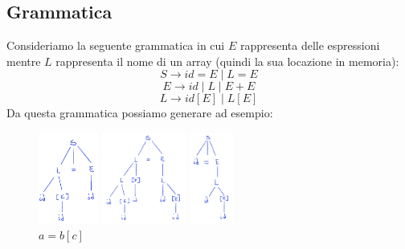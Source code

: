 \documentclass[11pt]{article}
\begin{document}
\subsection{Grammatica}
Consideriamo la seguente grammatica in cui $E$ rappresenta delle espressioni 
mentre $L$ rappresenta il nome di un array (quindi la sua locazione in memoria):
$$S \rightarrow id = E\;|\;L = E $$
$$E \rightarrow id \; |\; L \;|\; E + E$$
$$L \rightarrow id[E] \; |\; L[E]$$
Da questa grammatica possiamo generare ad esempio:
\begin{figure}[!htb]
  \centering
    \includegraphics[width=\linewidth, height=3cm, keepaspectratio]{img/DerivationTree0.png}
    \caption*{$a[b] = c$}\label{fig:derivation-tree-0}
  \endminipage\hfill
    \includegraphics[width=\linewidth, height=3cm, keepaspectratio]{img/DerivationTree1.png}
    \caption*{$a[b][c]=d[e]$}\label{fig:derivation-tree-1}
  \endminipage\hfill
    \includegraphics[width=\linewidth, height=3cm, keepaspectratio]{img/DerivationTree2.png}
    \caption*{$a = b[c]$}\label{fig:derivation-tree-2}
  \endminipage
\end{figure}
\end{document}
